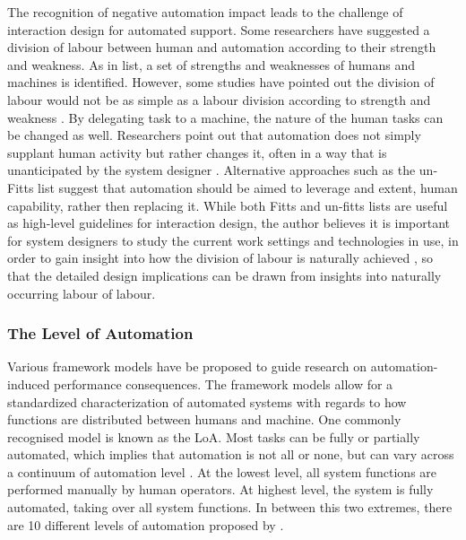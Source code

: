 The recognition of negative automation impact leads to the challenge of interaction design for automated support.  Some researchers have suggested a division of labour between human and automation according to their strength and weakness. As in \cite{Fitts} list, a set of strengths and weaknesses of humans and machines is identified. However, some studies have pointed out the division of labour would not be as simple as a labour division according to strength and weakness \citep{Bradshaw2011}. By delegating task to a machine, the nature of the human tasks can be changed as well. Researchers point out that automation does not simply supplant human activity but rather changes it, often in a way that is unanticipated by the system designer \citep{Bradshaw2011}. Alternative approaches such as the un-Fitts list \citep{Hoffman2002} suggest that automation should be aimed to leverage and extent, human capability, rather then replacing it.  While both Fitts and un-fitts lists are useful as high-level guidelines for interaction design, the author believes it is important for system designers to study the current work settings and technologies in use, in order to gain insight into how the division of labour is naturally achieved \citep{Crabtree2012}, so that the detailed design implications can be drawn from insights into naturally occurring labour of labour. \\


\subsubsection{The Level of Automation}\label{sec:lrloa}
Various framework models have be proposed to guide research on automation-induced performance consequences. The framework models allow for a standardized characterization of automated systems with regards to how functions are distributed between humans and machine. One commonly recognised model is known as the \acf{LoA}. Most tasks can be fully or partially automated, which implies that automation is not all or none, but can vary across a continuum of automation level \citep{Wickens2010}. At the lowest level, all system functions are performed manually by human operators.  At highest level, the system is fully automated, taking over all system functions. In between this two extremes, there are 10 different levels of automation proposed by \cite{Wickens2010}. \\

